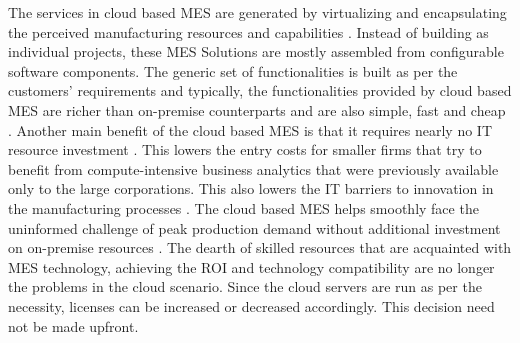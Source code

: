 \documentclass[10pt,conference,compsocconf]{IEEEtran}
\begin{document}
The services in cloud based MES are generated by virtualizing and encapsulating the perceived manufacturing resources and capabilities \cite{Tao_Zhang:2015:Manufacturing_Service}. Instead of building as individual projects, these MES Solutions are mostly assembled from configurable software components. The generic set of functionalities is built as per the customers’ requirements and typically, the functionalities provided by cloud based MES are richer than on-premise counterparts \cite{Marston_Li:2010:Cloud_computing} and are also simple, fast and cheap \cite{Voorsluys_Broberg:2010:Introduction_to}. Another main benefit of the cloud based MES is that it requires nearly no IT resource investment \cite{Lenart:2011:ERP_in}. This lowers the entry costs for smaller firms that try to benefit from compute-intensive business analytics that were previously available only to the large corporations. This also lowers the IT barriers to innovation in the manufacturing processes \cite{Marston_Li:2010:Cloud_computing}. The cloud based MES helps smoothly face the uninformed challenge of peak production demand without additional investment on on-premise resources \cite{Wood_Gerber:2009:The_Case}. The dearth of skilled resources that are acquainted with MES technology, achieving the ROI and technology compatibility are no longer the problems in the cloud scenario. Since the cloud servers are run as per the necessity, licenses can be increased or decreased accordingly. This decision need not be made upfront.
\end{document}
